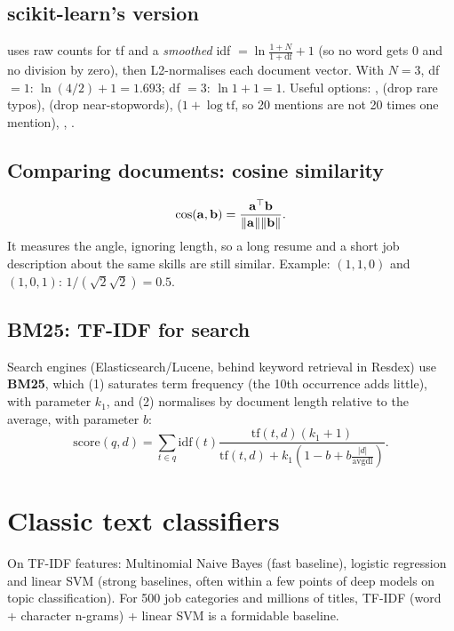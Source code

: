 \subsection{scikit-learn's version}
 uses raw counts for tf and a \emph{smoothed} idf $= \ln\frac{1 + N}{1 + \text{df}} + 1$ (so no word gets 0 and no division by
zero), then L2-normalises each document vector. With $N = 3$, df $= 1$: $\ln(4/2) + 1 = 1.693$; df $= 3$: $\ln1 + 1 = 1$.
Useful options: ,  (drop rare typos),  (drop near-stopwords), 
($1 + \log\text{tf}$, so 20 mentions are not 20 times one mention), , .

\subsection{Comparing documents: cosine similarity}
\[ \cos(\mathbf a,\mathbf b) = \frac{\mathbf a^\top\mathbf b}{\lVert \mathbf a\rVert\lVert \mathbf b\rVert}. \]
It measures the angle, ignoring length, so a long resume and a short job description about the same skills are still similar.
Example: $(1,1,0)$ and $(1,0,1)$: $1/(\sqrt2\sqrt2) = 0.5$.

\subsection{BM25: TF-IDF for search}
Search engines (Elasticsearch/Lucene, behind keyword retrieval in Resdex) use \textbf{BM25}, which (1) saturates term frequency (the 10th
occurrence adds little), with parameter $k_1$, and (2) normalises by document length relative to the average, with parameter $b$:
\[ \text{score}(q, d) = \sum_{t\in q}\text{idf}(t)\frac{\text{tf}(t,d)(k_1 + 1)}{\text{tf}(t,d) + k_1(1 - b + b\frac{|d|}{\text{avgdl}})}. \]

\section{Classic text classifiers}
On TF-IDF features: Multinomial Naive Bayes (fast baseline), logistic regression and linear SVM (strong baselines, often within a few points of
deep models on topic classification). For 500 job categories and millions of titles, TF-IDF (word + character n-grams) + linear SVM is a
formidable baseline.

